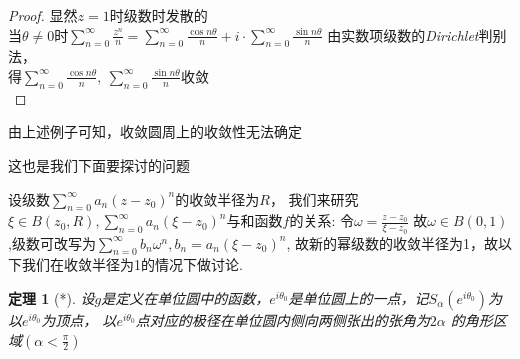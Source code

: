 \documentclass[b5paper,decoration]{qyxf-book}%
\newtheorem{mypro}{定理}[section]%
\begin{document}
\begin{proof}
    显然$z=1$时级数时发散的\\
    当$\theta\neq0$时$\displaystyle{\sum\limits_{n=0}^\infty\frac{z^n}{n}=
    \sum\limits_{n=0}^\infty\frac{\cos n\theta}{n}+i\cdot\sum\limits_{n=0}^\infty \frac{\sin n\theta}{n}}$
    由实数项级数的\emph{Dirichlet}判别法，\\
    得$\displaystyle{\sum\limits_{n=0}^\infty\frac{\cos n\theta}{n},\ \sum\limits_{n=0}^\infty \frac{\sin n\theta}{n}}$收敛\\
\end{proof}
由上述例子可知，收敛圆周上的收敛性无法确定\par 这也是我们下面要探讨的问题\par
设级数$\displaystyle{\sum\limits_{n=0}^\infty a_n(z-z_0)^n}$的收敛半径为$R$，
我们来研究$\displaystyle{\xi\in B(z_0,R),\sum\limits_{n=0}^\infty a_n(\xi-z_0)^n}$与和函数$f$的关系:
令$\displaystyle{\omega=\frac{z-z_0}{\xi-z_0}}$
故$\omega\in B(0,1)$,级数可改写为$\displaystyle{\sum\limits_{n=0}^\infty b_n\omega^n},b_n=a_n(\xi-z_0)^n$,
故新的幂级数的收敛半径为1，故以下我们在收敛半径为1的情况下做讨论.

\begin{mypro}[*]
    设$g$是定义在单位圆中的函数，$e^{i\theta_0}$是单位圆上的一点，记$S_\alpha(e^{i\theta_0})$为以$e^{i\theta_0}$为顶点，
    以$e^{i\theta_0}$点对应的极径在单位圆内侧向两侧张出的张角为$2\alpha$
    的角形区域$(\alpha<\frac{\pi}{2})$
\end{mypro}
\end{document}
